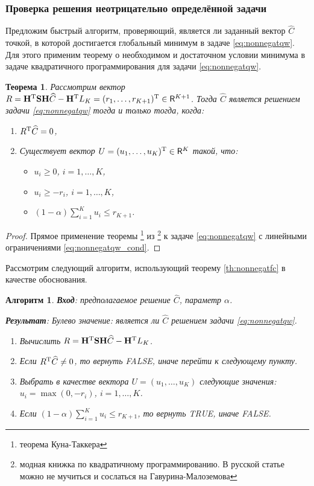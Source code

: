 \documentclass[12pt,a4paper]{article}
\newtheorem{algorithm}{Алгоритм}
\newtheorem{theorem}{Теорема}
\begin{document}
\subsubsection{Проверка решения неотрицательно определённой задачи}
Предложим быстрый алгоритм, проверяющий, является ли заданный вектор $\widehat C$ точкой, в которой достигается глобальный минимум в задаче \eqref{eq:nonnegatqw}. Для этого применим теорему о необходимом и достаточном условии минимума в задаче квадратичного программирования для задачи \eqref{eq:nonnegatqw}.
\begin{theorem}
	Рассмотрим вектор $R =  \mathbf{H}^{\mathrm{T}} \mathbf{S} \mathbf{H} \widehat C - \mathbf{H}^{\mathrm{T}} L_K = (r_1, \ldots, r_{K+1})^{\mathrm{T}} \in \mathsf{R}^{K+1}$. Тогда $\widehat C$ является решением задачи \eqref{eq:nonnegatqw} тогда и только тогда, когда:
	\begin{enumerate}
		\item $R^{\mathrm{T}} \widehat C = 0$,
		\item Существует вектор $U = (u_1, \ldots, u_K)^{\mathrm{T}} \in \mathsf{R}^K$ такой, что: \begin{itemize}
			\item $u_i \ge 0$, $i = 1, \ldots, K$,
			\item $u_i \ge -r_i$, $i = 1, \ldots, K$,
			\item $(1 - \alpha) \sum_{i=1}^K u_i \le r_{K+1}$.
		\end{itemize}
	\end{enumerate}
\end{theorem} \label{th:nonnegatfc}
\begin{proof}
	Прямое применение теоремы \footnote{теорема Куна-Таккера} из \footnote{модная книжка по квадратичному программированию. В русской статье можно не мучиться и сослаться на Гавурина-Малоземова} к задаче \eqref{eq:nonnegatqw} с линейными ограничениями \eqref{eq:nonnegatqw_cond}.
\end{proof}

Рассмотрим следующий алгоритм, использующий теорему \ref{th:nonnegatfc} в качестве обоснования.
\begin{algorithm}
	\label{alg:nonnegatfc}
	\textbf{Вход}: предполагаемое решение $\widehat C$, параметр $\alpha$.
	
	\textbf{Результат}:
	Булево значение: является ли $\widehat C$ решением задачи \eqref{eq:nonnegatqw}.
	
	\begin{enumerate}
		\item Вычислить $R = \mathbf{H}^{\mathrm{T}} \mathbf{S} \mathbf{H} \widehat C - \mathbf{H}^{\mathrm{T}} L_K$.
		\item Если $R^{\mathrm{T}} \widehat C \neq 0$, то вернуть FALSE, иначе перейти к следующему пункту.
		\item Выбрать в качестве вектора $U = (u_1, \ldots, u_K)$ следующие значения: $u_i = \max(0, -r_i)$, $i = 1, \ldots, K$.
		\item Если $(1 - \alpha) \sum_{i=1}^K u_i \le r_{K+1}$, то вернуть TRUE, иначе FALSE.
	\end{enumerate}
\end{algorithm}
\end{document}
